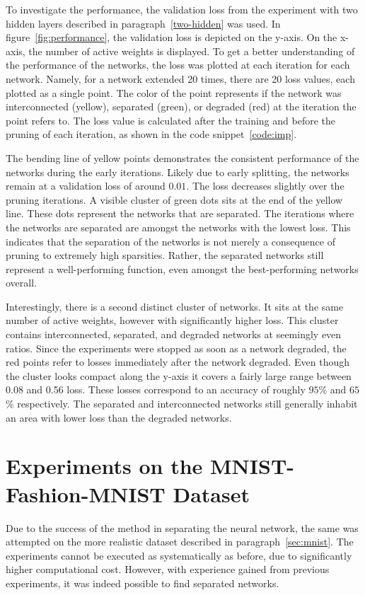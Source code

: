 To investigate the performance, the validation loss from the experiment with two hidden layers described in paragraph~\ref{two-hidden} was used.
In figure~\ref{fig:performance}, the validation loss is depicted on the y-axis.
On the x-axis, the number of active weights is displayed.
To get a better understanding of the performance of the networks, the loss was plotted at each iteration for each network.
Namely, for a network extended 20 times, there are 20 loss values, each plotted as a single point.
The color of the point represents if the network was interconnected (yellow), separated (green), or degraded (red) at the iteration the point refers to.
The loss value is calculated after the training and before the pruning of each iteration, as shown in the code snippet~\ref{code:imp}.

The bending line of yellow points demonstrates the consistent performance of the networks during the early iterations.
Likely due to early splitting, the networks remain at a validation loss of around $0.01$.
The loss decreases slightly over the pruning iterations.
A visible cluster of green dots sits at the end of the yellow line.
These dots represent the networks that are separated.
The iterations where the networks are separated are amongst the networks with the lowest loss.
This indicates that the separation of the networks is not merely a consequence of pruning to extremely high sparsities.
Rather, the separated networks still represent a well-performing function, even amongst the best-performing networks overall.

Interestingly, there is a second distinct cluster of networks.
It sits at the same number of active weights, however with significantly higher loss.
This cluster contains interconnected, separated, and degraded networks at seemingly even ratios.
Since the experiments were stopped as soon as a network degraded, the red points refer to losses immediately after the network degraded.
Even though the cluster looks compact along the y-axis it covers a fairly large range between 0.08 and 0.56 loss. These losses correspond to an accuracy of roughly $95$\% and $65$\% respectively.
The separated and interconnected networks still generally inhabit an area with lower loss than the degraded networks.


\section{Experiments on the MNIST-Fashion-MNIST Dataset}
Due to the success of the method in separating the neural network, the same was attempted on the more realistic dataset described in paragraph~\ref{sec:mnist}.
The experiments cannot be executed as systematically as before, due to significantly higher computational cost.
However, with experience gained from previous experiments, it was indeed possible to find separated networks.

